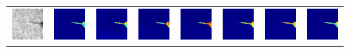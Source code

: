 \documentclass[sn-mathphys]{sn-jnl}%
\theoremstyle{thmstyleone}%
\theoremstyle{thmstyletwo}%
\theoremstyle{thmstylethree}%
\begin{document}
\begin{figure}
{\begin{tabular}{p{1.2cm}p{1.2cm}p{1.2cm}p{1.2cm}p{1.2cm}p{1.2cm}p{1.2cm}p{1.2cm}}
    \includegraphics[width=0.6in]{fig7-2.png}&
    \includegraphics[width=0.6in]{fig7-2-0.png}&
    \includegraphics[width=0.6in]{fig7-2-50.png}&
    \includegraphics[width=0.6in]{fig7-2-100.png}&
    \includegraphics[width=0.6in]{fig7-2-150.png}&
    \includegraphics[width=0.6in]{fig7-2-200.png}&
    \includegraphics[width=0.6in]{fig7-2-250.png}&
    \includegraphics[width=0.6in]{fig7-2-300.png}\\


\end{tabular}}
\end{figure}
\end{document}

